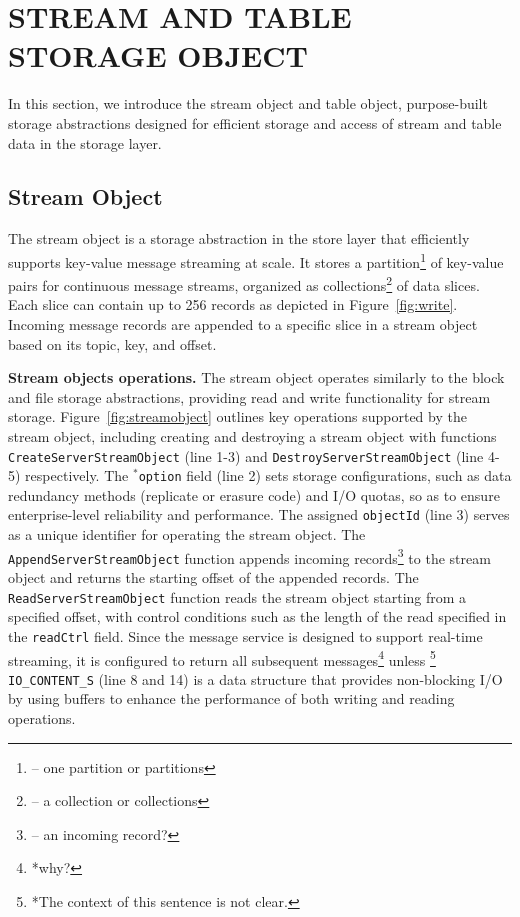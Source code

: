 \section{STREAM AND TABLE STORAGE OBJECT} 
\label{sec:datagen}

In this section, we introduce the stream object and table object, purpose-built storage abstractions designed for efficient storage and access of stream and table data in the storage layer.


\subsection{Stream Object}

The stream object is a storage abstraction in the store layer that efficiently supports key-value message streaming at scale. It stores a partition\footnote{-- one partition or partitions} of key-value pairs for continuous message streams, organized as collections\footnote{-- a collection or collections} of data slices. Each slice can contain up to 256 records as depicted in Figure~\ref{fig:write}. Incoming message records are appended  to a specific slice in a stream object based on its topic, key, and offset.

\noindent \textbf{Stream objects operations.} The stream object operates similarly to the block and file storage abstractions, providing read and write functionality for stream storage. Figure~\ref{fig:streamobject} outlines key operations supported by the stream object, including creating and destroying a stream object with  functions \texttt{CreateServerStreamObject} (line 1-3) and \texttt{DestroyServerStreamObject} (line 4-5) respectively. The \texttt{$^*$option} field (line 2) sets storage configurations, such as data redundancy methods (replicate or erasure code) and I/O quotas, so as to ensure enterprise-level reliability and performance. The assigned \texttt{objectId} (line 3) serves as a unique identifier for operating the stream object. The \texttt{AppendServerStreamObject} function appends incoming records\footnote{-- an incoming record?}  to the stream object and returns the starting offset of the appended records. The \texttt{ReadServerStreamObject} function reads the stream object starting from a specified offset, with control conditions such as the length of the read specified in the \texttt{readCtrl} field. 
Since the message service is designed to support real-time streaming, it is configured to return all subsequent messages\footnote{*why?} unless \footnote{*The context of this sentence is not clear.} \texttt{IO\_CONTENT\_S} (line 8 and 14) is a data structure that provides non-blocking I/O by using buffers to enhance the performance of both writing and reading operations.


